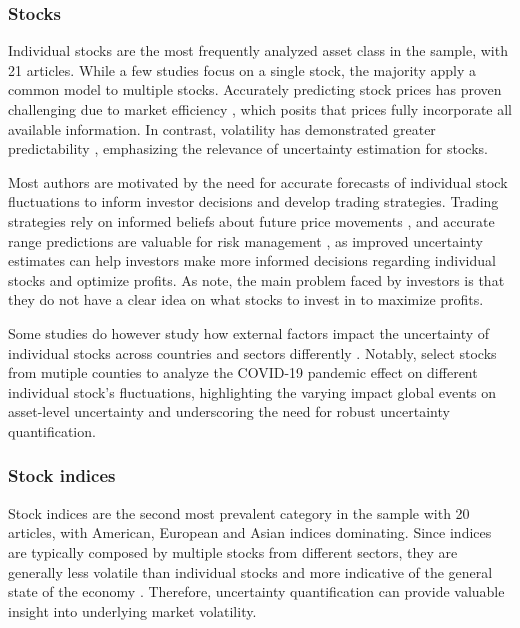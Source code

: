 


\subsubsection{Stocks}
Individual stocks are the most frequently analyzed asset class in the sample, with 21 articles. While a few studies focus on a single stock, the majority apply a common model to multiple stocks. Accurately predicting stock prices has proven challenging due to market efficiency \parencite{fama1970efficient}, which posits that prices fully incorporate all available information. In contrast, volatility has demonstrated greater predictability \parencite{poon2003forecasting}, emphasizing the relevance of uncertainty estimation for stocks. 

Most authors are motivated by the need for accurate forecasts of individual stock fluctuations to inform investor decisions and develop trading strategies. Trading strategies rely on informed beliefs about future price movements \parencite{vuletic2024finGAN}, and accurate range predictions are valuable for risk management \parencite{Li2024DeepAR}, as improved uncertainty estimates can help investors make more informed decisions regarding individual stocks and optimize profits. As \textcite{govindasamy2014prediction} note, the main problem faced by investors is that they do not have a clear idea on what stocks to invest in to maximize profits.  

Some studies do however study how external factors impact the uncertainty of individual stocks across countries and sectors differently \parencite{chandra2021bayesian, soleymani2022longterm}. Notably, \textcite{chandra2021bayesian} select stocks from mutiple counties to analyze the COVID-19 pandemic effect on different individual stock's fluctuations, highlighting the varying impact global events on asset-level uncertainty and underscoring the need for robust uncertainty quantification. 

\subsubsection{Stock indices}
Stock indices are the second most prevalent category in the sample with 20 articles, with American, European and Asian indices dominating. Since indices are typically composed by multiple stocks from different sectors, they are generally less volatile than individual stocks and more indicative of the general state of the economy \parencite{sezer2020financial}. Therefore, uncertainty quantification can provide valuable insight into underlying market volatility. 

